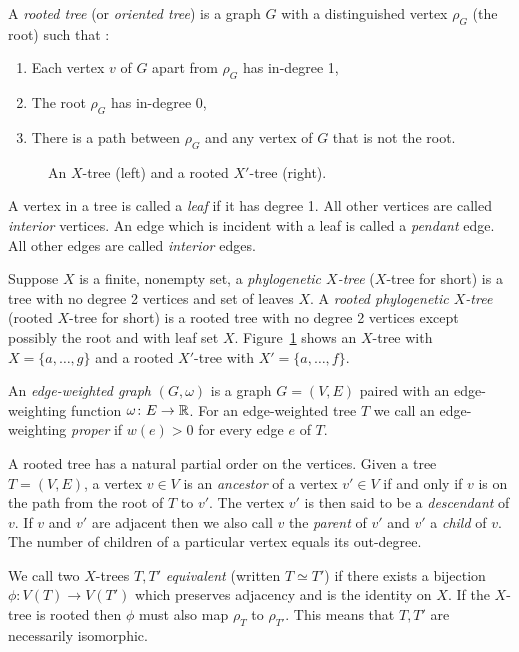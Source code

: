 A \textit{rooted tree} (or \textit{oriented tree}) is a graph $G$
with a distinguished vertex $\rho_G$ (the root) such that
\cite{knuth97taocp1}:
\begin{enumerate}[label=\alph*)]
\item Each vertex $v$ of $G$ apart from $\rho_G$ has in-degree 1,
\item The root $\rho_G$ has in-degree 0,
\item There is a path between $\rho_G$ and any vertex of $G$ that is not the
  root.
\end{enumerate}

\begin{figure}
  \centering
  
  \caption{An $X$-tree (left) and a rooted $X'$-tree (right).}
  \label{fig:x-tree-ex}
\end{figure}

A vertex in a tree is called a \textit{leaf} if it has degree 1.  All other
vertices are called \textit{interior} vertices.  An edge which is incident
with a leaf is called a \textit{pendant} edge.  All other edges are called
\textit{interior} edges.

Suppose $X$ is a finite, nonempty set, a \textit{phylogenetic $X$-tree}
($X$-tree for short) is a tree with no degree 2 vertices and set of leaves
$X$.  A \textit{rooted phylogenetic $X$-tree} (rooted $X$-tree for short) is a
rooted tree with no degree 2 vertices except possibly the root and with leaf
set $X$.  Figure~\ref{fig:x-tree-ex} shows an $X$-tree with $X =
\{a,\dotsc,g\}$ and a rooted $X'$-tree with $X' = \{a,\dotsc,f\}$.

An \textit{edge-weighted graph} $(G,\omega)$ is a graph $G=(V,E)$ paired with
an edge-weighting function $\omega \colon E \to {\mathbb R}$.  For an edge-weighted
tree $T$ we call an edge-weighting \textit{proper} if $w(e) > 0$ for every
edge $e$ of $T$.

A rooted tree has a natural partial order on the vertices.  Given a tree
$T=(V,E)$, a vertex $v \in V$ is an \textit{ancestor} of a vertex $v' \in V$
if and only if $v$ is on the path from the root of $T$ to $v'$.  The vertex
$v'$ is then said to be a \textit{descendant} of $v$.  If $v$ and $v'$ are
adjacent then we also call $v$ the \textit{parent} of $v'$ and $v'$ a
\textit{child} of $v$.  The number of children of a particular vertex equals
its out-degree.

We call two $X$-trees $T,T'$ \textit{equivalent} (written $T \simeq T'$) if
there exists a bijection $\phi \colon V(T) \to V(T')$ which preserves
adjacency and is the identity on $X$.  If the $X$-tree is rooted then $\phi$
must also map $\rho_{T}$ to $\rho_{T'}$.  This means that $T,T'$ are
necessarily isomorphic.

